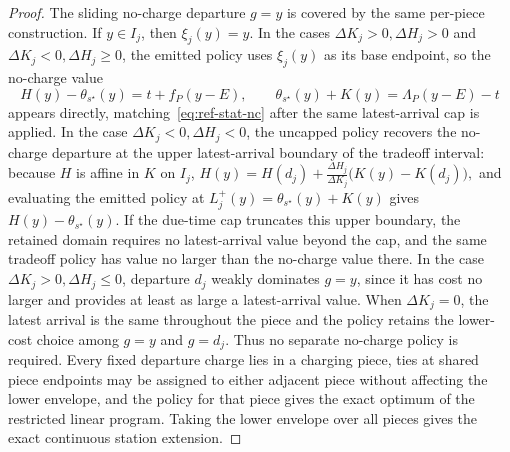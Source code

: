 \documentclass[review,3p,authoryear]{elsarticle}
\theoremstyle{plain}
\theoremstyle{definition}
\theoremstyle{remark}
\begin{document}
\begin{proof}
The sliding no-charge departure \(g=y\) is covered by the same per-piece construction.
If \(y\in I_j\), then \(\xi_j(y)=y\). In the cases
\(\Delta K_j>0,\Delta H_j>0\) and \(\Delta K_j<0,\Delta H_j\ge0\), the emitted policy
uses \(\xi_j(y)\) as its base endpoint, so the no-charge value
\[
H(y)-\theta_{s^\star}(y)=t+f_P(y-E),\qquad
\theta_{s^\star}(y)+K(y)=\Lambda_P(y-E)-t
\]
appears directly, matching~\eqref{eq:ref-stat-nc} after the same latest-arrival cap is
applied. In the case \(\Delta K_j<0,\Delta H_j<0\), the uncapped policy recovers the
no-charge departure at the upper latest-arrival boundary of the tradeoff interval:
because \(H\) is affine in \(K\) on \(I_j\),
$ H(y)=H(d_j)+\frac{\Delta H_j}{\Delta K_j}\bigl(K(y)-K(d_j)\bigr),$
and evaluating the emitted policy at
\(L_j^+(y)=\theta_{s^\star}(y)+K(y)\) gives \(H(y)-\theta_{s^\star}(y)\). If the
due-time cap truncates this upper boundary, the retained domain requires no
latest-arrival value beyond the cap, and the same tradeoff policy has value no larger
than the no-charge value there. In the case \(\Delta K_j>0,\Delta H_j\le0\), departure
\(d_j\) weakly dominates \(g=y\), since it has cost no larger and provides at least as
large a latest-arrival value. When \(\Delta K_j=0\), the latest arrival is the same
throughout the piece and the policy retains the lower-cost choice among \(g=y\) and
\(g=d_j\). Thus no separate no-charge policy is required. Every fixed departure charge
lies in a charging piece, ties at shared piece endpoints may be assigned to either
adjacent piece without affecting the lower envelope, and the policy for that piece gives
the exact optimum of the restricted linear program. Taking the lower envelope over all
pieces gives the exact continuous station extension.
\end{proof}
\end{document}
